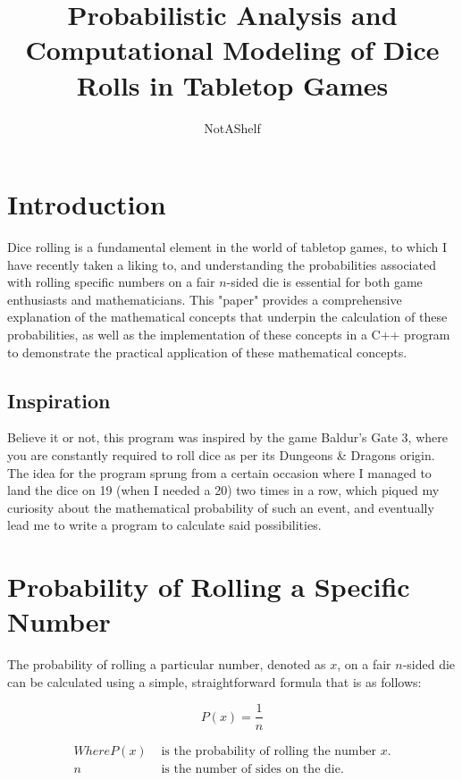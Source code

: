 \documentclass{article}
\title{Probabilistic Analysis and Computational Modeling of Dice Rolls in Tabletop Games}
\author{NotAShelf}
\begin{document}
\maketitle

\tableofcontents

\section{Introduction}

Dice rolling is a fundamental element in the world of tabletop games, to which I have recently taken a liking to, and
understanding the probabilities associated with rolling specific numbers on a fair $n$-sided die is essential
for both game enthusiasts and mathematicians. This "paper" provides a comprehensive explanation of the
mathematical concepts that underpin the calculation of these probabilities, as well as the implementation of
these concepts in a C++ program to demonstrate the practical application of these mathematical concepts.

\subsection{Inspiration}

Believe it or not, this program was inspired by the game Baldur's Gate 3, where you are constantly required to
roll dice as per its Dungeons \& Dragons origin. The idea for the program sprung from a certain occasion
where I managed to land the dice on 19 (when I needed a 20) two times in a row, which piqued my curiosity about the
mathematical probability of such an event, and eventually lead me to write a program to calculate said possibilities.


\section{Probability of Rolling a Specific Number}

The probability of rolling a particular number, denoted as $x$, on a fair $n$-sided die can be calculated
using a simple, straightforward formula that is as follows:

\[
P(x) = \frac{1}{n}
\]

\begin{align*}
Where P(x) & \text{ is the probability of rolling the number } x. \\
n & \text{ is the number of sides on the die.}
\end{align*}
\end{document}
